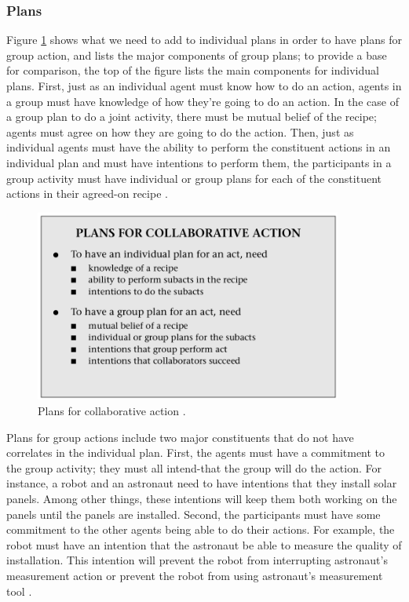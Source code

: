 \documentclass[11pt]{article}
\begin{document}
\subsubsection{Plans}

Figure \ref{fig:plans} shows what we need to add to individual plans in order to
have plans for group action, and lists the major components of group plans; to
provide a base for comparison, the top of the figure lists the main components
for individual plans. First, just as an individual agent must know how to do an
action, agents in a group must have knowledge of how they’re going to do an
action. In the case of a group plan to do a joint activity, there must be mutual
belief of the recipe; agents must agree on how they are going to do the action.
Then, just as individual agents must have the ability to perform the constituent
actions in an individual plan and must have intentions to perform them, the
participants in a group activity must have individual or group plans for each of
the constituent actions in their agreed-on recipe \cite{grosz:plans-discourse}
\cite{grosz:collaborative-systems}.

\begin{figure}[tbh]
  \center
  \includegraphics[width=0.9\textwidth]{figure/plans.png}
  \caption{Plans for collaborative action \cite{grosz:collaborative-systems}.}
  \label{fig:plans}
\end{figure}

Plans for group actions include two major constituents that do not have
correlates in the individual plan. First, the agents must have a commitment to
the group activity; they must all intend-that the group will do the action. For
instance, a robot and an astronaut need to have intentions that they install
solar panels. Among other things, these intentions will keep them both working
on the panels until the panels are installed. Second, the participants must have
some commitment to the other agents being able to do their actions. For example,
the robot must have an intention that the astronaut be able to measure the
quality of installation. This intention will prevent the robot from interrupting
astronaut's measurement action or prevent the robot from using astronaut's
measurement tool \cite{grosz:plans-discourse}
\cite{grosz:collaborative-systems}.
\end{document}
